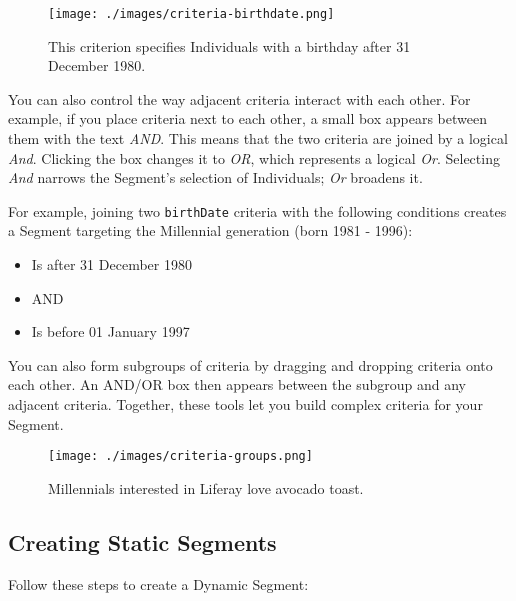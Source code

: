 \begin{figure}
\centering
\texttt{[image: ./images/criteria-birthdate.png]}
\caption{This criterion specifies Individuals with a birthday after 31
December 1980.}
\end{figure}

You can also control the way adjacent criteria interact with each other.
For example, if you place criteria next to each other, a small box
appears between them with the text \emph{AND}. This means that the two
criteria are joined by a logical \emph{And}. Clicking the box changes it
to \emph{OR}, which represents a logical \emph{Or}. Selecting \emph{And}
narrows the Segment's selection of Individuals; \emph{Or} broadens it.

For example, joining two \texttt{birthDate} criteria with the following
conditions creates a Segment targeting the Millennial generation (born
1981 - 1996):

\begin{itemize}
\tightlist
\item
  Is after 31 December 1980
\item
  AND
\item
  Is before 01 January 1997
\end{itemize}

You can also form subgroups of criteria by dragging and dropping
criteria onto each other. An AND/OR box then appears between the
subgroup and any adjacent criteria. Together, these tools let you build
complex criteria for your Segment.

\begin{figure}
\centering
\texttt{[image: ./images/criteria-groups.png]}
\caption{Millennials interested in Liferay love avocado toast.}
\end{figure}

\subsection{Creating Static Segments}\label{creating-static-segments}

Follow these steps to create a Dynamic Segment:

